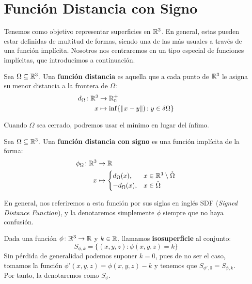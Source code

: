 
\chapter{Función Distancia con Signo}
Tenemos como objetivo representar superficies en $\mathbb{R}^3$. En general, estas pueden estar definidas de multitud de formas, siendo una de las más usuales a través de una función implícita. Nosotros nos centraremos en un tipo especial de funciones implícitas, que introducimos a continuación.

\begin{definicion}
  Sea $\Omega \subseteq \mathbb{R}^3$. Una \textbf{función distancia} es aquella que a cada punto de $\mathbb{R}^3$ le asigna su menor distancia a la frontera de $\Omega$:
    \begin{align*}
          d_{\Omega} \colon \mathbb{R}^3 &\to \mathbb{R}_0^+\\
          x &\mapsto \inf\{\Vert x-y\Vert) \colon y \in \delta\Omega\}
    \end{align*}

    Cuando $\Omega$ sea cerrado, podremos usar el mínimo en lugar del ínfimo.
\end{definicion}
 
\begin{definicion}[SDF]\label{d:sdf}
  Sea $\Omega \subseteq \mathbb{R}^3$. Una \textbf{función distancia con signo} es una función implícita de la forma:
  \begin{align*}
          \phi_{\Omega} \colon \mathbb{R}^3 &\to \mathbb{R}\\
          x &\mapsto \begin{cases}
      d_{\Omega}(x),  &x\in \mathbb{R}^3\setminus \mathring{\Omega} \\
      -d_{\Omega}(x), &x\in \mathring{\Omega}
    \end{cases}
    \end{align*}

  En general, nos referiremos a esta función por sus siglas en inglés SDF (\textit{Signed Distance Function}), y la denotaremos simplemente $\phi$ siempre que no haya confusión.
\end{definicion}

\begin{definicion}
  Dada una función $\phi\colon \mathbb{R}^3 \to \mathbb{R}$ y $k\in\mathbb{R}$, llamamos \textbf{isosuperficie} al conjunto:
  \begin{equation*}
      S_{\phi,k} = \{(x,y,z) :  \phi(x,y,z)=k\}
  \end{equation*}
  Sin pérdida de generalidad podemos suponer $k=0$, pues de no ser el caso, tomamos la función $\phi'(x,y,z)=\phi(x,y,z)-k$ y tenemos que $S_{\phi',0} = S_{\phi,k}$. Por tanto, la denotaremos como $S_\phi$.
\end{definicion}

